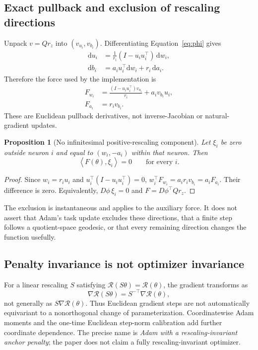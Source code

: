 \documentclass[11pt,letterpaper]{article}
\newtheorem{proposition}{Proposition}
\theoremstyle{remark}\newtheorem{remark}{Remark}
\newcommand{\inner}[2]{\left\langle#1,#2\right\rangle}
\begin{document}
\subsection{Exact pullback and exclusion of rescaling directions}
Unpack $v=Qr_z$ into $(v_{u_i},v_{b_i})$. Differentiating Equation~\eqref{eq:phi} gives
\begin{align}
\mathrm du_i&=\frac{1}{r_i}(I-u_iu_i^\top)\,\mathrm dw_i,\\
\mathrm db_i&=a_i u_i^\top\mathrm dw_i+r_i\,\mathrm da_i.
\end{align}
Therefore the force used by the implementation is
\begin{align}
F_{w_i}&=\frac{(I-u_iu_i^\top)v_{u_i}}{r_i}+a_i v_{b_i}u_i,\label{eq:pullw}\\
F_{a_i}&=r_i v_{b_i}.\label{eq:pulla}
\end{align}
These are Euclidean pullback derivatives, not inverse-Jacobian or natural-gradient updates.

\begin{proposition}[No infinitesimal positive-rescaling component]\label{prop:horizontal}
Let $\xi_i$ be zero outside neuron $i$ and equal to $(w_i,-a_i)$ within that neuron. Then
\begin{equation}\label{eq:horizontal}
\inner{F(\theta)}{\xi_i}=0\qquad\text{for every }i.
\end{equation}
\end{proposition}
\begin{proof}
Since $w_i=r_iu_i$ and $u_i^\top(I-u_iu_i^\top)=0$,
$w_i^\top F_{w_i}=a_i r_i v_{b_i}=a_i F_{a_i}$. Their difference is zero. Equivalently, $D\phi\,\xi_i=0$ and $F=D\phi^\top Qr_z$.
\end{proof}
The exclusion is instantaneous and applies to the auxiliary force. It does not assert that Adam's task update excludes these directions, that a finite step follows a quotient-space geodesic, or that every remaining direction changes the function usefully.

\subsection{Penalty invariance is not optimizer invariance}\label{sec:notinvariant}
For a linear rescaling $S$ satisfying $\mathcal R(S\theta)=\mathcal R(\theta)$, the gradient transforms as
\begin{equation}\label{eq:covariance}
\nabla\mathcal R(S\theta)=S^{-\top}\nabla\mathcal R(\theta),
\end{equation}
not generally as $S\nabla\mathcal R(\theta)$. Thus Euclidean gradient steps are not automatically equivariant to a nonorthogonal change of parameterization. Coordinatewise Adam moments and the one-time Euclidean step-norm calibration add further coordinate dependence. The precise name is \emph{Adam with a rescaling-invariant anchor penalty}; the paper does not claim a fully rescaling-invariant optimizer.
\end{document}
